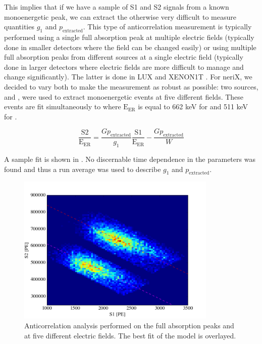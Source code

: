 This implies that if we have a sample of S1 and S2 signals from a known monoenergetic peak, we can extract the otherwise very difficult to measure quantities $g_1$ and $p_{\textrm{extracted}}$.  This type of anticorrelation measurement is typically performed using a single full absorption peak at multiple electric fields (typically done in smaller detectors where the field can be changed easily) or using multiple full absorption peaks from different sources at a single electric field (typically done in larger detectors where electric fields are more difficult to manage and change significantly).  The latter is done in LUX \cite{akerib2016improved} and XENON1T \cite{aprile2017first}.  For neriX, we decided to vary both to make the measurement as robust as possible: two sources, \cesium{} and \sodium{}, were used to extract monoenergetic events at five different fields.  These events are fit simultaneously to  where $\textrm{E}_{\textrm{ER}}$ is equal to 662 keV for \cesium{} and 511 keV for \sodium{}.


 \begin{equation}
        \label{eqn:nerix_anticorrelation_line}
        \frac{\textrm{S2}}{\textrm{E}_{\textrm{ER}}} = \frac{G p_{\textrm{extracted}}}{g_1} \frac{\textrm{S1}}{\textrm{E}_{\textrm{ER}}} - \frac{G p_{\textrm{extracted}}}{W}
\end{equation}

A sample fit is shown in .  No discernable time dependence in the parameters was found and thus a run average was used to describe $g_1$ and $p_{\textrm{extracted}}$.

\begin{figure}[t]
        \centering
	\includegraphics[width=0.85\textwidth]{nerix_anticorrelation}
	\caption{Anticorrelation analysis performed on the full absorption peaks \cesium{} and \sodium{} at five different electric fields.  The best fit of the model is overlayed.}
	\label{fig:nerix_anticorrelation}
\end{figure}


